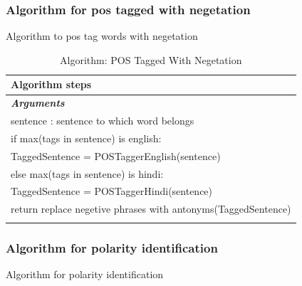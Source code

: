 \documentclass[12pt]{book}
\begin{document}
\subsubsection{Algorithm for pos tagged with negetation}
Algorithm to pos tag words with negetation\\

\begin{longtable}[c]{ |p{16cm}|  }
  \hline
  \textbf{Algorithm steps} \\
  \hline
  \endhead
  \textbf{\textit{Arguments}} \\
  \hline
  sentence : sentence to which word belongs\\
  \hline
  if max(tags in sentence) is english:\\
  \hspace{4em}TaggedSentence = POSTaggerEnglish(sentence)\\
  else max(tags in sentence) is hindi:\\
  \hspace{4em}TaggedSentence = POSTaggerHindi(sentence)\\
  return replace negetive phrases with antonyms(TaggedSentence)\\
  \hline
  \caption{ Algorithm: POS Tagged With Negetation}\label{tab:tab_pos_tagger}\\
\end{longtable}

\subsubsection{Algorithm for polarity identification}
Algorithm for polarity identification\\
\end{document}
